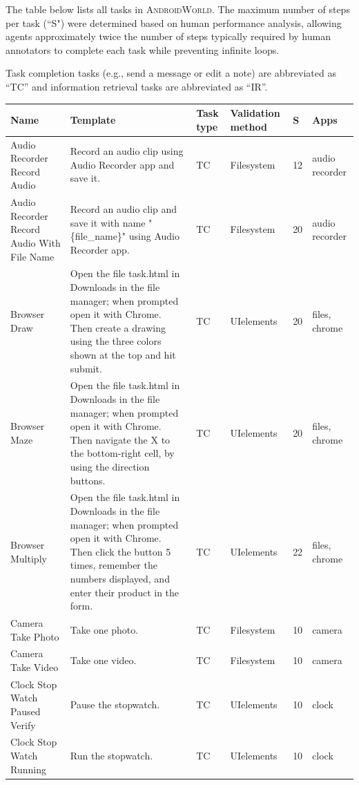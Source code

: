 \documentclass{article}
\newcommand{\system}{\textsc{AndroidWorld}\xspace}
\begin{document}
\begin{appendices}
The table below lists all tasks in \system. The maximum number of steps per task (``S") were determined based on human performance analysis, allowing agents approximately twice the number of steps typically required by human annotators to complete each task while preventing infinite loops.

Task completion tasks (e.g., send a message or edit a note) are abbreviated as ``TC'' and information retrieval tasks are abbreviated as ``IR''.

\small
\begin{longtable}{>{\RaggedRight\seqsplit}p{.8in}p{2in}p{.3in}p{.5in}p{.3in}p{.5in}}
\toprule
\textbf{Name} & \textbf{Template} & \textbf{Task type} & \textbf{Validation method} & \textbf{S} & \textbf{Apps} \\
\midrule
\endhead
Audio Recorder Record Audio & Record an audio clip using Audio Recorder app and save it. & TC & Filesystem & 12 & audio recorder \\
\midrule
Audio Recorder Record Audio With File Name & Record an audio clip and save it with name "\{file\_name\}" using Audio Recorder app. & TC & Filesystem & 20 & audio recorder \\
\midrule
Browser Draw & Open the file task.html in Downloads in the file manager; when prompted open it with Chrome. Then create a drawing using the three colors shown at the top and hit submit. & TC & UI\-elements & 20 & files, chrome \\
\midrule
Browser Maze & Open the file task.html in Downloads in the file manager; when prompted open it with Chrome. Then navigate the X to the bottom-right cell, by using the direction buttons. & TC & UI\-elements & 20 & files, chrome \\
\midrule
Browser Multiply & Open the file task.html in Downloads in the file manager; when prompted open it with Chrome. Then click the button 5 times, remember the numbers displayed, and enter their product in the form. & TC & UI\-elements & 22 & files, chrome \\
\midrule
Camera Take Photo & Take one photo. & TC & Filesystem & 10 & camera \\
\midrule
Camera Take Video & Take one video. & TC & Filesystem & 10 & camera \\
\midrule
Clock Stop Watch Paused Verify & Pause the stopwatch. & TC & UI\-elements & 10 & clock \\
\midrule
Clock Stop Watch Running & Run the stopwatch. & TC & UI\-elements & 10 & clock \\

\end{longtable}
\end{appendices}
\end{document}
